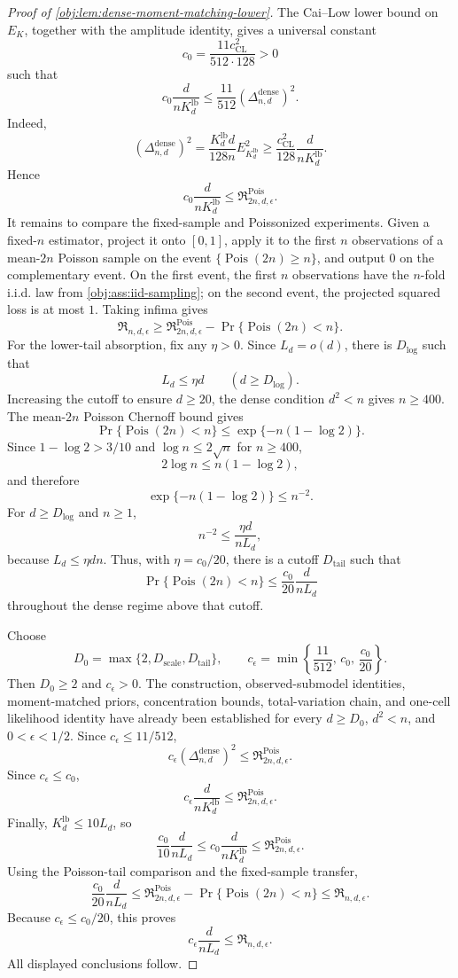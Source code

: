 \begin{proof}[Proof of \cref{obj:lem:dense-moment-matching-lower}]
The Cai--Low lower bound on \(E_K\), together with the amplitude identity, gives a universal constant
\[
c_0=\frac{11c_{\mathrm{CL}}^2}{512\cdot128}>0
\]
such that
\[
c_0\frac{d}{nK_d^{\mathrm{lb}}}
\le
\frac{11}{512}(\Delta_{n,d}^{\mathrm{dense}})^2.
\]
Indeed,
\[
(\Delta_{n,d}^{\mathrm{dense}})^2
=
\frac{K_d^{\mathrm{lb}}d}{128n}E_{K_d^{\mathrm{lb}}}^2
\ge
\frac{c_{\mathrm{CL}}^2}{128}\frac{d}{nK_d^{\mathrm{lb}}}.
\]
Hence
\[
c_0\frac{d}{nK_d^{\mathrm{lb}}}
\le
\mathfrak R^{\mathrm{Pois}}_{2n,d,\epsilon}.
\]
It remains to compare the fixed-sample and Poissonized experiments. Given a fixed-\(n\) estimator, project it onto \([0,1]\), apply it to the first \(n\) observations of a mean-\(2n\) Poisson sample on the event \(\{\operatorname{Pois}(2n)\ge n\}\), and output \(0\) on the complementary event. On the first event, the first \(n\) observations have the \(n\)-fold i.i.d. law from \cref{obj:ass:iid-sampling}; on the second event, the projected squared loss is at most \(1\). Taking infima gives
\[
\mathfrak R_{n,d,\epsilon}
\ge
\mathfrak R^{\mathrm{Pois}}_{2n,d,\epsilon}
-
\Pr\{\operatorname{Pois}(2n)<n\}.
\]
For the lower-tail absorption, fix any \(\eta>0\). Since \(L_d=o(d)\), there is \(D_{\log}\) such that
\[
L_d\le \eta d
\qquad(d\ge D_{\log}).
\]
Increasing the cutoff to ensure \(d\ge20\), the dense condition \(d^2<n\) gives \(n\ge400\). The mean-\(2n\) Poisson Chernoff bound gives
\[
\Pr\{\operatorname{Pois}(2n)<n\}
\le
\exp\{-n(1-\log2)\}.
\]
Since \(1-\log2>3/10\) and \(\log n\le2\sqrt n\) for \(n\ge400\),
\[
2\log n\le n(1-\log2),
\]
and therefore
\[
\exp\{-n(1-\log2)\}\le n^{-2}.
\]
For \(d\ge D_{\log}\) and \(n\ge1\),
\[
n^{-2}\le \frac{\eta d}{nL_d},
\]
because \(L_d\le \eta dn\). Thus, with \(\eta=c_0/20\), there is a cutoff \(D_{\mathrm{tail}}\) such that
\[
\Pr\{\operatorname{Pois}(2n)<n\}
\le
\frac{c_0}{20}\frac{d}{nL_d}
\]
throughout the dense regime above that cutoff.

Choose
\[
D_0=\max\{2,D_{\mathrm{scale}},D_{\mathrm{tail}}\},
\qquad
c_\epsilon=\min\left\{\frac{11}{512},\,c_0,\,\frac{c_0}{20}\right\}.
\]
Then \(D_0\ge2\) and \(c_\epsilon>0\). The construction, observed-submodel identities, moment-matched priors, concentration bounds, total-variation chain, and one-cell likelihood identity have already been established for every \(d\ge D_0\), \(d^2<n\), and \(0<\epsilon<1/2\). Since \(c_\epsilon\le11/512\),
\[
c_\epsilon(\Delta_{n,d}^{\mathrm{dense}})^2
\le
\mathfrak R^{\mathrm{Pois}}_{2n,d,\epsilon}.
\]
Since \(c_\epsilon\le c_0\),
\[
c_\epsilon\frac{d}{nK_d^{\mathrm{lb}}}
\le
\mathfrak R^{\mathrm{Pois}}_{2n,d,\epsilon}.
\]
Finally, \(K_d^{\mathrm{lb}}\le10L_d\), so
\[
\frac{c_0}{10}\frac{d}{nL_d}
\le
c_0\frac{d}{nK_d^{\mathrm{lb}}}
\le
\mathfrak R^{\mathrm{Pois}}_{2n,d,\epsilon}.
\]
Using the Poisson-tail comparison and the fixed-sample transfer,
\[
\frac{c_0}{20}\frac{d}{nL_d}
\le
\mathfrak R^{\mathrm{Pois}}_{2n,d,\epsilon}
-
\Pr\{\operatorname{Pois}(2n)<n\}
\le
\mathfrak R_{n,d,\epsilon}.
\]
Because \(c_\epsilon\le c_0/20\), this proves
\[
c_\epsilon\frac{d}{nL_d}
\le
\mathfrak R_{n,d,\epsilon}.
\]
All displayed conclusions follow.
\end{proof}

